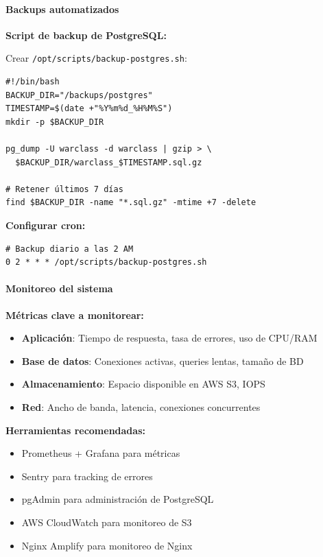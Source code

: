 \paragraph{Backups automatizados}

\textbf{Script de backup de PostgreSQL:}

Crear \texttt{/opt/scripts/backup-postgres.sh}:

\begin{verbatim}
#!/bin/bash
BACKUP_DIR="/backups/postgres"
TIMESTAMP=$(date +"%Y%m%d_%H%M%S")
mkdir -p $BACKUP_DIR

pg_dump -U warclass -d warclass | gzip > \
  $BACKUP_DIR/warclass_$TIMESTAMP.sql.gz

# Retener últimos 7 días
find $BACKUP_DIR -name "*.sql.gz" -mtime +7 -delete
\end{verbatim}

\textbf{Configurar cron:}

\begin{verbatim}
# Backup diario a las 2 AM
0 2 * * * /opt/scripts/backup-postgres.sh
\end{verbatim}

\paragraph{Monitoreo del sistema}

\textbf{Métricas clave a monitorear:}

\begin{itemize}
	\item \textbf{Aplicación}: Tiempo de respuesta, tasa de errores, uso de CPU/RAM
	\item \textbf{Base de datos}: Conexiones activas, queries lentas, tamaño de BD
	\item \textbf{Almacenamiento}: Espacio disponible en AWS S3, IOPS
	\item \textbf{Red}: Ancho de banda, latencia, conexiones concurrentes
\end{itemize}

\textbf{Herramientas recomendadas:}

\begin{itemize}
	\item Prometheus + Grafana para métricas
	\item Sentry para tracking de errores
	\item pgAdmin para administración de PostgreSQL
	\item AWS CloudWatch para monitoreo de S3
	\item Nginx Amplify para monitoreo de Nginx
\end{itemize}

